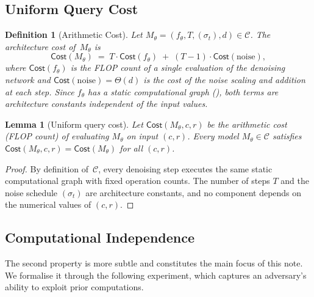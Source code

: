 \documentclass[11pt]{article}
\newtheorem{definition}{Definition}[section]
\newtheorem{lemma}{Lemma}[section]
\newcommand{\calC}{\mathcal{C}}
\newcommand{\Cost}{\mathsf{Cost}}
\begin{document}
\subsection{Uniform Query Cost}
\label{subsec:uniform-cost}

\begin{definition}[Arithmetic Cost]
\label{def:arith-cost}
Let $M_\theta = (f_\theta, T, (\sigma_t), d) \in \calC$. The \emph{architecture cost} of~$M_\theta$ is
\[
    \Cost(M_\theta) \;=\; T \cdot \Cost(f_\theta) \;+\; (T-1) \cdot \Cost(\text{noise}),
\]
where $\Cost(f_\theta)$ is the FLOP count of a single evaluation of the denoising network and $\Cost(\text{noise}) = \Theta(d)$ is the cost of the noise scaling and addition at each step. Since $f_\theta$ has a static computational graph (), both terms are architecture constants independent of the input values.
\end{definition}

\begin{lemma}[Uniform query cost]
\label{lem:uniform-cost}
Let $\Cost(M_\theta, c, r)$ be the arithmetic cost (FLOP count) of evaluating $M_\theta$ on input $(c, r)$. Every model $M_\theta \in \calC$ satisfies $\Cost(M_\theta, c, r) = \Cost(M_\theta)$ for all $(c, r)$.
\end{lemma}

\begin{proof}
By definition of~$\calC$, every denoising step executes the same static computational graph with fixed operation counts. The number of steps $T$ and the noise schedule $(\sigma_t)$ are architecture constants, and no component depends on the numerical values of $(c, r)$.
\end{proof}

\subsection{Computational Independence}
\label{subsec:independence}

The second property is more subtle and constitutes the main focus of this note. We formalise it through the following experiment, which captures an adversary's ability to exploit prior computations.
\end{document}
